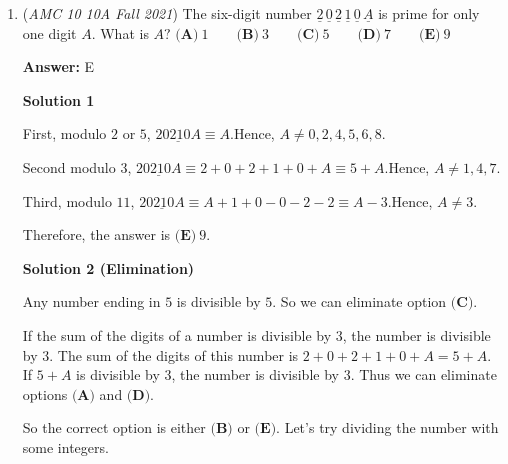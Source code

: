 \begin{enumerate}
 For Route A, the distance is $6$ miles and the speed to travel this distance is $\frac{1}{2}$ mile per minute. Thus, the time it takes on Route A is $12$ minutes.

 For Route B, we have to use the equation twice: once for the distance of $5- \frac{1}{2} = \frac{9}{2}$ miles with a speed of $\frac{2}{3}$ mile per minute and a distance of $\frac{1}{2}$ miles at a speed of $\frac{1}{3}$ mile per minute. Thus, the time it takes to go on Route B is $\frac{9}{2} \cdot \frac{3}{2} + \frac{1}{2} \cdot 3 = \frac{27}{4} + \frac{3}{2} = \frac{33}{4}$ minutes. Thus, Route B is $12 - \frac{33}{4} = \frac{15}{4} = 3\frac{3}{4}$ faster than Route A. Thus, the answer is $\boxed{\textbf{(B)}\  3 \frac{3}{4}}.$



	\item (\textit{AMC 10 10A Fall 2021}) The six-digit number $\underline{2}\,\underline{0}\,\underline{2}\,\underline{1}\,\underline{0}\,\underline{A}$ is prime for only one digit $A.$ What is $A?$
$\textbf{(A)}\ 1 \qquad\textbf{(B)}\ 3 \qquad\textbf{(C)}\ 5 \qquad\textbf{(D)}\ 7 \qquad\textbf{(E)}\ 9$

 \textbf{Answer: }E



\textbf{Solution 1}

First, modulo $2$ or $5$, $\underline{20210A} \equiv A$.Hence, $A \neq 0, 2, 4, 5, 6, 8$.

 Second modulo $3$, $\underline{20210A} \equiv 2 + 0 + 2 + 1 + 0 + A \equiv 5 + A$.Hence, $A \neq 1, 4, 7$.

 Third, modulo $11$, $\underline{20210A} \equiv A + 1 + 0 - 0 - 2 - 2 \equiv A - 3$.Hence, $A \neq 3$.

 Therefore, the answer is $\boxed{\textbf{(E)}\ 9}$.

 



\textbf{Solution 2 (Elimination)}

Any number ending in $5$ is divisible by $5$. So we can eliminate option $\textbf{(C)}$.

 If the sum of the digits of a number is divisible by $3$, the number is divisible by $3$. The sum of the digits of this number is $2 + 0 + 2 + 1 + 0 + A = 5 + A$. If $5 + A$ is divisible by $3$, the number is divisible by $3$. Thus we can eliminate options $\textbf{(A)}$ and $\textbf{(D)}$.

 So the correct option is either $\textbf{(B)}$ or $\textbf{(E)}$. Let's try dividing the number with some integers.


\end{enumerate}
